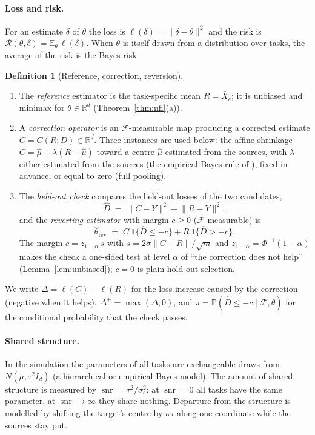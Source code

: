 \documentclass[10pt,a4paper]{article}
\theoremstyle{plain}
\theoremstyle{definition}
\newtheorem{definition}[theorem]{Definition}
\theoremstyle{remark}
\newcommand{\R}{\mathbb{R}}
\newcommand{\E}{\mathbb{E}}
\newcommand{\Prob}{\mathbb{P}}
\newcommand{\risk}{\mathcal{R}}
\newcommand{\Dh}{\widehat{D}}
\newcommand{\rev}{\mathrm{rev}}
\newcommand{\Ybar}{\bar{Y}}
\newcommand{\norm}[1]{\lVert #1\rVert}
\DeclareMathOperator{\snr}{snr}
\begin{document}
\paragraph{Loss and risk.} For an estimate $\delta$ of $\theta$ the loss is $\ell(\delta)=\norm{\delta-\theta}^2$ and the risk is $\risk(\theta,\delta)=\E_\theta\,\ell(\delta)$. When $\theta$ is itself drawn from a distribution over tasks, the average of the risk is the Bayes risk.

\begin{definition}[Reference, correction, reversion]\label{def:main}
\begin{enumerate}[leftmargin=2em,label=(\alph*)]
\item The \emph{reference} estimator is the task-specific mean $R=\bar X_e$; it is unbiased and minimax for $\theta\in\R^d$ (Theorem~\ref{thm:nfl}(a)).
\item A \emph{correction operator} is an $\mathcal F$-measurable map producing a corrected estimate $C=C(R;D)\in\R^d$. Three instances are used below: the affine shrinkage $C=\hat\mu+\lambda(R-\hat\mu)$ toward a centre $\hat\mu$ estimated from the sources, with $\lambda$ either estimated from the sources (the empirical Bayes rule of \citet{efronmorris1973,efronmorris1975,morris1983}), fixed in advance, or equal to zero (full pooling).
\item The \emph{held-out check} compares the held-out losses of the two candidates,
\[
\Dh \;=\; \norm{C-\Ybar}^2-\norm{R-\Ybar}^2 ,
\]
and the \emph{reverting estimator} with margin $c\ge0$ ($\mathcal F$-measurable) is
\[
\hat\theta_\rev \;=\; C\,\mathbf 1\{\Dh\le -c\} + R\,\mathbf 1\{\Dh>-c\} .
\]
The margin $c=z_{1-\alpha}\,s$ with $s=2\sigma\norm{C-R}/\sqrt m$ and $z_{1-\alpha}=\Phi^{-1}(1-\alpha)$ makes the check a one-sided test at level $\alpha$ of ``the correction does not help'' (Lemma~\ref{lem:unbiased}); $c=0$ is plain hold-out selection.
\end{enumerate}
We write $\Delta=\ell(C)-\ell(R)$ for the loss increase caused by the correction (negative when it helps), $\Delta^+=\max(\Delta,0)$, and $\pi=\Prob(\Dh\le -c\mid\mathcal F,\theta)$ for the conditional probability that the check passes.
\end{definition}

\paragraph{Shared structure.} In the simulation the parameters of all tasks are exchangeable draws from $N(\mu,\tau^2 I_d)$ (a hierarchical or empirical Bayes model). The amount of shared structure is measured by $\snr=\tau^2/\sigma_e^2$: at $\snr=0$ all tasks have the same parameter, at $\snr\to\infty$ they share nothing. Departure from the structure is modelled by shifting the target's centre by $\kappa\tau$ along one coordinate while the sources stay put.
\end{document}

